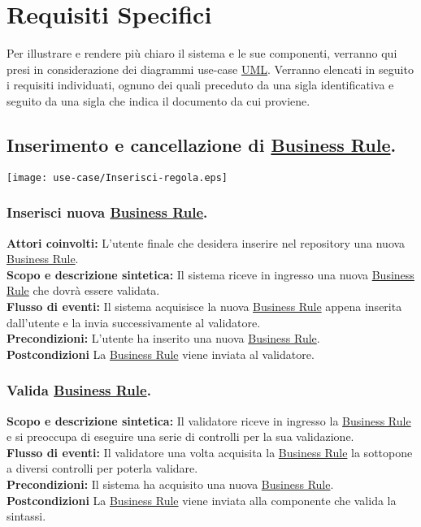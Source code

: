 \chapter{Requisiti Specifici}
Per illustrare e rendere pi\`u chiaro il sistema e le sue componenti, verranno qui presi in considerazione dei diagrammi use-case \underline{UML}. Verranno elencati in seguito i requisiti individuati, ognuno dei quali preceduto da una sigla identificativa e seguito da una sigla che indica il documento da cui proviene.


\section{Inserimento e cancellazione di \underline{Business Rule}.}
\begin{center}
 \texttt{[image: use-case/Inserisci-regola.eps]}
\end{center}

\subsection{Inserisci nuova \underline{Business Rule}.}
\textbf{Attori coinvolti:} L'utente finale che desidera inserire nel repository una nuova \underline{Business Rule}.\\
\textbf{Scopo e descrizione sintetica:} Il sistema riceve in ingresso una nuova \underline{Business Rule} che dovr\`a essere validata.\\
\textbf{Flusso di eventi:} Il sistema acquisisce la nuova \underline{Business Rule} appena inserita dall'utente e la invia successivamente al validatore.\\
\textbf{Precondizioni:} L'utente ha inserito una nuova \underline{Business Rule}.\\
\textbf{Postcondizioni} La \underline{Business Rule} viene inviata al validatore.

\subsection{Valida \underline{Business Rule}.}
\textbf{Scopo e descrizione sintetica:} Il validatore riceve in ingresso la \underline{Business Rule} e si preoccupa di eseguire una serie di controlli per la sua validazione.\\
\textbf{Flusso di eventi:} Il validatore una volta acquisita la \underline{Business Rule} la sottopone a diversi controlli per poterla validare.\\
\textbf{Precondizioni:} Il sistema ha acquisito una nuova \underline{Business Rule}.\\
\textbf{Postcondizioni} La \underline{Business Rule} viene inviata alla componente che valida la sintassi.
 
